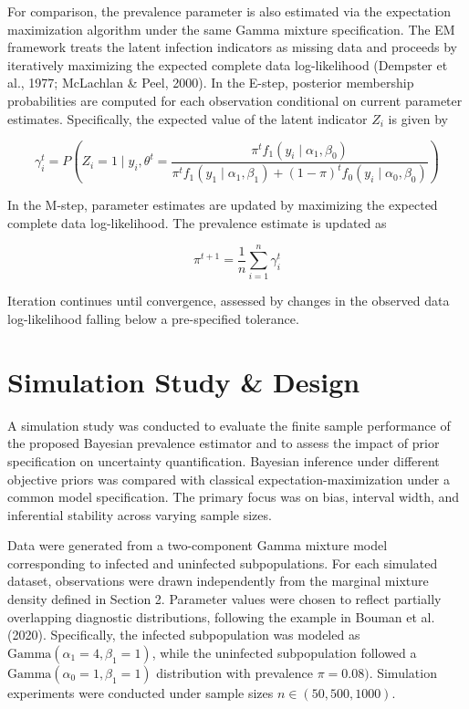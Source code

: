 \documentclass[11pt]{article}
\begin{document}
For comparison, the prevalence parameter is also estimated via the expectation maximization algorithm under the same Gamma mixture specification. The EM framework treats the latent infection indicators as missing data and proceeds by iteratively maximizing the expected complete data log-likelihood (Dempster et al., 1977; McLachlan \& Peel, 2000). 
In the E-step, posterior membership probabilities are computed for each observation conditional on current parameter estimates. Specifically, the expected value of the latent indicator $Z_i$ is given by 

\[
\gamma_{i}^{t} = P(Z_i = 1 \mid y_i, \theta^{t} = \frac{\pi ^t f_1(y_i \mid \alpha_1, \beta_0)}{ \pi ^t f_1(y_1 \mid \alpha_1, \beta_1) + (1 - \pi)^t f_0 ( y_i \mid \alpha_0, \beta_0)} )
\]


In the M-step, parameter estimates are updated by maximizing the expected complete data log-likelihood. The prevalence estimate is updated as 

\[
\pi^{t+1} = \frac{1}{n} \sum_{i=1}^{n} \gamma_{i} ^{t}
\]

Iteration continues until convergence, assessed by changes in the observed data log-likelihood falling below a pre-specified tolerance. 

\section{Simulation Study \& Design}
A simulation study was conducted to evaluate the finite sample performance of the proposed Bayesian prevalence estimator and to assess the impact of prior specification on uncertainty quantification. Bayesian inference under different objective priors was compared with classical expectation-maximization under a common model specification. The primary focus was on bias, interval width, and inferential stability across varying sample sizes.

Data were generated from a two-component Gamma mixture model corresponding to infected and uninfected subpopulations. For each simulated dataset, observations were drawn independently from the marginal mixture density defined in Section 2. Parameter values were chosen to reflect partially overlapping diagnostic distributions, following the example in Bouman et al. (2020). Specifically, the infected subpopulation was modeled as $ \text{Gamma} (\alpha_1 = 4, \beta_1 = 1)$, while the uninfected subpopulation followed a  $\text{Gamma} (\alpha_0 = 1, \beta_1 = 1)$ distribution with prevalence $\pi = 0.08)$. Simulation experiments were conducted under sample sizes $n \in (50,500,1000)$. 
\end{document}
